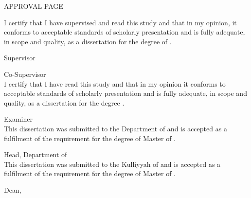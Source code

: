 \documentclass[a4paper]{memoir}
\begin{document}
\thispagestyle{empty}

\begin{LARGE}
\begin{center}
\MakeUppercase{Approval Page}
\end{center}
\end{LARGE}
\vspace{48pt}
I certify that I have supervised and read this study and that in my opinion, it 
conforms to acceptable standards of scholarly presentation and is fully 
adequate, in scope and quality, as a dissertation for the degree of \myDegree.
\\[24pt]

\hfill \makebox[2in]{\dotfill}

\hfill \mySupervisor

\hfill Supervisor
\\[24pt]

\hfill \makebox[2in]{\dotfill}

\hfill \myCoSupervisor

\hfill Co-Supervisor\\[24pt]

\noindent I certify that I have read this study and that in my opinion it 
conforms to acceptable standards of scholarly presentation and is fully 
adequate, in scope and quality, as a dissertation for the degree 
\myDegree.\\[24pt]

\hfill \makebox[2in]{\dotfill}

\hfill \myExaminer

\hfill Examiner\\[24pt]

\noindent This dissertation was submitted to the Department of \myDepartment 
and is 
accepted as a fulfilment of the requirement for the degree of Master of 
\mySubject.\\[24pt]

\hfill \makebox[2in]{\dotfill}

\hfill \myDepartmentHead

\hfill Head, Department of \myDepartment\\[24pt]

\noindent This dissertation was submitted to the Kulliyyah of \myKulliyah and 
is accepted as a fulfilment of the requirement for the degree of Master of 
\mySubject.\\[24pt]

\hfill \makebox[2in]{\dotfill}

\hfill \myKulliyahDean

\hfill Dean, \myKulliyah\\[24pt]
\end{document}
